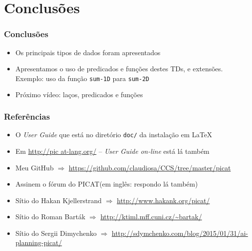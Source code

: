 \documentclass[10pt]{beamer}
\begin{document}
\section{Conclusões}
\begin{frame}
    \frametitle{Conclusões}
    \begin{itemize}
    \item Os principais tipos de dados foram apresentados
      \pause 
    \item Apresentamos o uso de predicados e funções destes TDs, 
    e extensões. Exemplo: uso da função \texttt{sum-1D} para \texttt{sum-2D}
      \pause 
    \item Próximo vídeo: laços, predicados e funções

    
    \end{itemize}
\end{frame}


\begin{frame}
    \frametitle{Referências}
    \begin{itemize}
    \item O \textit{User Guide} que está no diretório  \texttt{doc/} da instalação em \LaTeX 
    \item Em \url{http://pic at-lang.org/} -- \textit{User Guide on-line} está lá também
    
     \item Meu GitHub $\Rightarrow $ \url{https://github.com/claudiosa/CCS/tree/master/picat}
    
    \item Assinem o fórum do PICAT(em inglês: respondo lá também)

    \item Sítio do Hakan  Kjellerstrand  $\Rightarrow $ \url{http://www.hakank.org/picat/}
    \item Sítio do Roman Barták  $\Rightarrow $ \url{http://ktiml.mff.cuni.cz/~bartak/}
    \item Sítio do Sergii Dimychenko  $\Rightarrow $ \url{http://sdymchenko.com/blog/2015/01/31/ai-planning-picat/}
    
    \end{itemize}
\end{frame}
\end{document}
